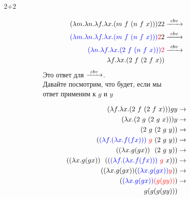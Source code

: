 \begin{frame}{2+2}
  \begin{figure}[t]
    \begin{subfigure}[t]{0.50\textwidth}
      \begin{align*}
        (\lambda m. \lambda n. \lambda f. \lambda x. \app{m\ f\ }{\app{n\ f\ }{x}}){} 2 2 &\cbv \\
        \textcolor{blue}{(\lambda m. \lambda n. \lambda f. \lambda x. \app{m\ f\ }{\app{n\ f\ }{x}}) {}} \textcolor{red}{2} 2 &\cbv \\
        \textcolor{blue}{( \lambda n. \lambda f. \lambda x. \app{2\ f\ }{\app{n\ f\ }{x}}){}} \textcolor{red}{2} & \cbv \\
        \lambda f. \lambda x. \app{2\ f\ }{\app{2\ f\ }{x}}   &
      \end{align*}
      Это ответ для $\xrightarrow{\ cbv\ }$.\\

      Давайте посмотрим, что будет, если мы \\
      ответ применим к $g$ и $y$
    \end{subfigure}
    \begin{subfigure}[t]{0.45\textwidth}
      \begin{align*}
        (\lambda f. \lambda x. (2\ f\  (2\ f\  x))) g y  &\rightarrow \\
        (\lambda x. (2\ g\  (2\ g\  x))) y  &\rightarrow \\
        (2\ g\  (2\ g\  y))   &\rightarrow \\
        (\textcolor{blue}{(\lambda f . (\lambda x . f (f x)))} \ \textcolor{red}{g}\  (2\ g\  y)) &\rightarrow \\
        ((\lambda x . g (g x)) \ \  (2\ g\  y)) &\rightarrow \\
        ((\lambda x . g (g x)) \ \  ((\textcolor{blue}{(\lambda f . (\lambda x . f (f x)))}\ \textcolor{red}{g}\  x) )) &\rightarrow \\
        ((\lambda x . g (g x))   (\textcolor{blue}{(\lambda x . g (g x)) }  \textcolor{red}{y})) &\rightarrow \\
        (\textcolor{blue}{(\lambda x . g (g x)) }  \textcolor{red}{(g (g y))}) &\rightarrow \\
        g (g (g (g y))) &
      \end{align*}
    \end{subfigure}
  \end{figure}
\end{frame}


